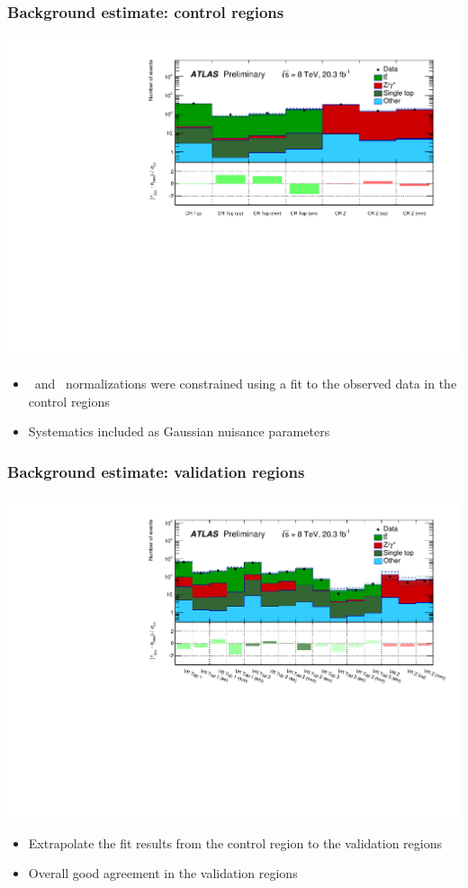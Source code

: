 \documentclass[10pt, svgnames]{beamer}
\begin{document}
\begin{frame}
  \frametitle{Background estimate: control regions}
  \includegraphics[width=\textwidth]{figures/blstop/histpull_CR_detailed.pdf}
  \begin{itemize}
    \item \TTBAR\ and \ZGAMMA\ normalizations were constrained using a fit to
      the observed data in the control regions
    \item Systematics included as Gaussian nuisance parameters
  \end{itemize}
\end{frame}


\begin{frame}
  \frametitle{Background estimate: validation regions}
  \includegraphics[width=\textwidth]{figures/blstop/histpull_VR_detailed.pdf}
  \begin{itemize}
    \item Extrapolate the fit results from the control region to the validation
      regions
    \item Overall good agreement in the validation regions
  \end{itemize}
\end{frame}
\end{document}
